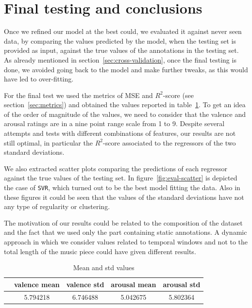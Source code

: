 \section{Final testing and conclusions}\label{sec:conclusions}

Once we refined our model at the best could, we evaluated it against never seen data, by comparing the values predicted by the model, when the testing set is provided as input, against the true values of the annotations in the testing set. As already mentioned in section~\ref{sec:cross-validation}, once the final testing is done, we avoided going back to the model and make further tweaks, as this would have led to over-fitting.

For the final test we used the metrics of MSE and $R^2$-score (see section~\ref{sec:metrics}) and obtained the values reported in table~\ref{table:eval-metrics}. To get an idea of the order of magnitude of the values, we need to consider that the valence and arousal ratings are in a nine point range scale from 1 to 9. Despite several attempts and tests with different combinations of features, our results are not still optimal, in particular the $R^2$-score associated to the regressors of the two standard deviations.

We also extracted scatter plots comparing the predictions of each regressor against the true values of the testing set. In  figure~\ref{fig:eval-scatter} is depicted the case of \texttt{SVR}, which turned out to be the best model fitting the data. Also in these figures it could be seen that the values of the standard deviations have not any type of regularity or clustering. 

The motivation of our results could be related to the composition of the dataset and the fact that we used only the part containing static annotations. A dynamic approach in which we consider values related to temporal windows and not to the total length of the music piece could have given different results. 

\begin{table}[b]
	\centering
{
		\begin{tabular}{lcccc}
			\toprule
			& valence mean & valence std & arousal mean & arousal std \\
			\midrule
		     & 5.794218 & 6.746488 & 5.042675 & 5.802364 \\
			\bottomrule
		\end{tabular}
	}
	\caption{Mean and std values}
\label{table:eval-metrics}
\end{table}

